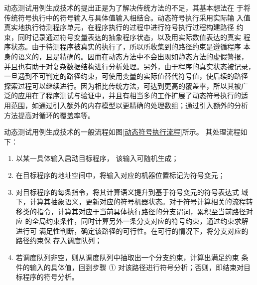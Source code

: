 

动态测试用例生成技术的提出正是为了解决传统方法的不足，其基本想法在
于将传统符号执行中的符号输入与具体值输入相结合。动态符号执行采用实际输
入值真实地执行待测程序单元，在程序执行的过程中进行符号执行过程构建路径
约束，同时记录通过符号变量表达的抽象程序状态，以及用实际数值表达的真实
程序状态。由于待测程序被真实的执行了，所以所收集到的路径约束是遵循程序
本身的语义的，且是精确的。因而在动态方法中不会出现如静态方法的虚假警报，
并且也有助于对复杂数据结构进行分析处理。另外，由于程序的真实状态被记录，
一旦遇到不可判定的路径约束，可使用变量的实际值替代符号值，使后续的路径
探索过程可以继续进行。因为相比传统方法，可达到更高的覆盖率，所以其被广
泛的应用在了程序测试与验证中，并且有相当多的工作扩展了动态符号执行的适
用范围，如通过引入额外的内存模型以更精确的处理数组；通过引入额外的分析
方法提高对循环的覆盖率等。

动态测试用例生成技术的一般流程如图\ref{动态符号执行流程}所示。 其处理流程如下：
\begin{enumerate}[(1)]
\item 以某一具体输入启动目标程序， 该输入可随机生成；
\item 在目标程序的地址空间中，将输入对应的机器位置标记为符号变元；
\item 对目标程序的每条指令，将其计算语义提升到基于符号变元的符号表达式
域下，计算其抽象语义，更新对应的符号机器状态。对于符号计算相关的流程转
移类的指令，计算其对应于当前具体执行路径的分支谓词，累积至当前路径对应
的全局约束条件，同时计算另外一条分支对应的符号约束，通过约束求解进行可
满足性判断，确定该路径的可行性。在可行的情况下，将分支对应的路径约束保
存入调度队列；
\item 若调度队列非空，则从调度队列中抽取出一个分支约束，计算出满足约束
条件的输入的具体值，回到步骤 ① 对该路径进行符号分析；否则，即结束对目
标程序的符号分析。
\end{enumerate}

